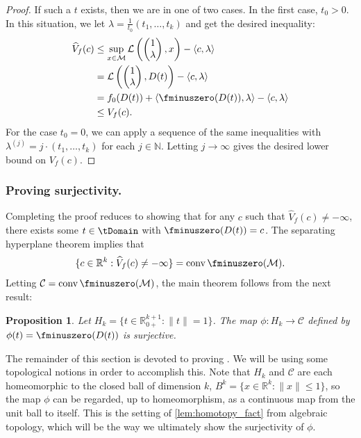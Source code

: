 \documentclass{article}
\numberwithin{equation}{section}
\newcommand{\R}{\mathbb{R}}
\newcommand{\N}{\mathbb{N}}
\DeclareMathOperator*{\conv}{conv}
\newtheorem{proposition}[thm]{Proposition}
\newcommand{\cM}{{\mathcal{M}}}
\newcommand{\cC}{\mathcal{C}}
\newcommand{\Voptf}{V_{f}}
\begin{document}
\begin{proof}
If such a $t$ exists, then we are in one of two cases.
In the first case, $t_0 > 0$. In this situation, we let 
$\lambda = \frac{1}{t_0}{(t_1,\dots,t_k)}$ 
and get the desired inequality:
\begin{align*}
    \widehat{V}_f(c) &\le \sup_{x \in \cM} \mathcal{L}\left(\begin{pmatrix} 1\\ \lambda\end{pmatrix}, x\right) - \langle c, \lambda\rangle\\
    &= \mathcal{L}\left(\begin{pmatrix} 1\\ \lambda\end{pmatrix}, D(t)\right) - \langle c, \lambda\rangle\\
    &= f_0(D(t)) + \langle \fminuszero(D(t)), \lambda\rangle - \langle c, \lambda\rangle\\
    &\le V_f(c).
\end{align*}
For the case $t_0 = 0$, we can apply a sequence of the same inequalities with
$\lambda^{(j)} = j\cdot (t_1,\dots,t_k)$ for each $j \in \N$.
Letting $j \to \infty$ gives the desired lower bound on $\Voptf(c)$.
\end{proof}

\subsubsection*{Proving surjectivity.}
Completing the proof
reduces to showing that for any $c$ such that $\widehat{V}_f(c) \neq -\infty$, there exists some $t \in \tDomain$ 
with
$\fminuszero(D(t)) = c$.
The separating hyperplane theorem implies that
\[\{c \in \R^k : \widehat{V}_f(c) \neq - \infty\} = \conv \fminuszero(\cM).\]
Letting $\cC = \conv \fminuszero(\cM)$, the main theorem follows from the next result: 

\begin{proposition}
\label{prop:surjective}
    Let $H_k = \{t \in \R^{k+1}_{0+} : \|t\|=1\}$. The map $\phi : H_k \rightarrow \cC$ defined by $\phi(t) = \fminuszero(D(t))$ is surjective.
\end{proposition}
   
The remainder of this section is devoted to proving . We will be using some topological notions in order to accomplish this.
Note that $H_k$ and $\cC$ are each homeomorphic to the closed ball of dimension $k$, $B^k = \{x \in \R^k : \|x\| \le 1\}$, so the map $\phi$ can be regarded, up to homeomorphism, as a continuous map from the unit ball to itself. This is the setting of \cref{lem:homotopy_fact} from algebraic topology, which will be the way we ultimately show the surjectivity of $\phi$.
\end{document}
